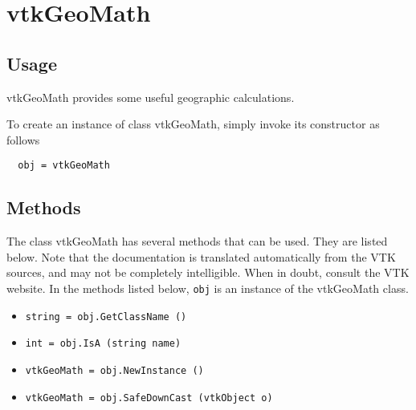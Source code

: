 \section{vtkGeoMath}

\subsection{Usage}

 vtkGeoMath provides some useful geographic calculations.

To create an instance of class vtkGeoMath, simply
invoke its constructor as follows
\begin{verbatim}
  obj = vtkGeoMath
\end{verbatim}
\subsection{Methods}

The class vtkGeoMath has several methods that can be used.
  They are listed below.
Note that the documentation is translated automatically from the VTK sources,
and may not be completely intelligible.  When in doubt, consult the VTK website.
In the methods listed below, \verb|obj| is an instance of the vtkGeoMath class.
\begin{itemize}
\item  \verb|string = obj.GetClassName ()|

\item  \verb|int = obj.IsA (string name)|

\item  \verb|vtkGeoMath = obj.NewInstance ()|

\item  \verb|vtkGeoMath = obj.SafeDownCast (vtkObject o)|

\end{itemize}
